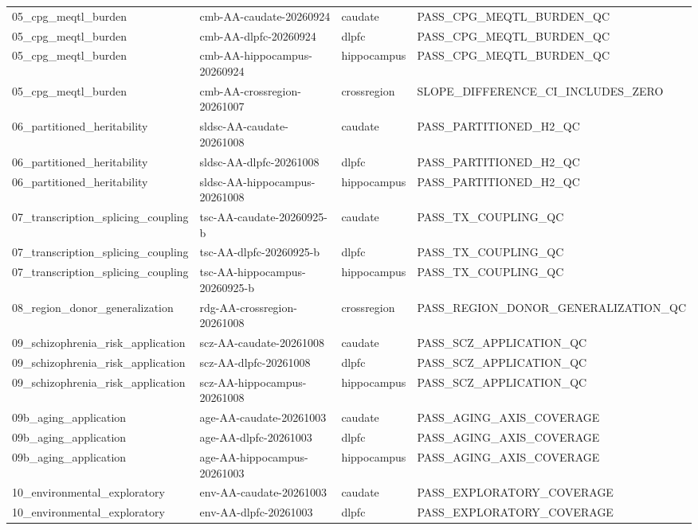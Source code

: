 \begin{tabular}{llll}
05\_cpg\_meqtl\_burden & cmb-AA-caudate-20260924 & caudate & PASS\_CPG\_MEQTL\_BURDEN\_QC \\
05\_cpg\_meqtl\_burden & cmb-AA-dlpfc-20260924 & dlpfc & PASS\_CPG\_MEQTL\_BURDEN\_QC \\
05\_cpg\_meqtl\_burden & cmb-AA-hippocampus-20260924 & hippocampus & PASS\_CPG\_MEQTL\_BURDEN\_QC \\
05\_cpg\_meqtl\_burden & cmb-AA-crossregion-20261007 & crossregion & SLOPE\_DIFFERENCE\_CI\_INCLUDES\_ZERO \\
06\_partitioned\_heritability & sldsc-AA-caudate-20261008 & caudate & PASS\_PARTITIONED\_H2\_QC \\
06\_partitioned\_heritability & sldsc-AA-dlpfc-20261008 & dlpfc & PASS\_PARTITIONED\_H2\_QC \\
06\_partitioned\_heritability & sldsc-AA-hippocampus-20261008 & hippocampus & PASS\_PARTITIONED\_H2\_QC \\
07\_transcription\_splicing\_coupling & tsc-AA-caudate-20260925-b & caudate & PASS\_TX\_COUPLING\_QC \\
07\_transcription\_splicing\_coupling & tsc-AA-dlpfc-20260925-b & dlpfc & PASS\_TX\_COUPLING\_QC \\
07\_transcription\_splicing\_coupling & tsc-AA-hippocampus-20260925-b & hippocampus & PASS\_TX\_COUPLING\_QC \\
08\_region\_donor\_generalization & rdg-AA-crossregion-20261008 & crossregion & PASS\_REGION\_DONOR\_GENERALIZATION\_QC \\
09\_schizophrenia\_risk\_application & scz-AA-caudate-20261008 & caudate & PASS\_SCZ\_APPLICATION\_QC \\
09\_schizophrenia\_risk\_application & scz-AA-dlpfc-20261008 & dlpfc & PASS\_SCZ\_APPLICATION\_QC \\
09\_schizophrenia\_risk\_application & scz-AA-hippocampus-20261008 & hippocampus & PASS\_SCZ\_APPLICATION\_QC \\
09b\_aging\_application & age-AA-caudate-20261003 & caudate & PASS\_AGING\_AXIS\_COVERAGE \\
09b\_aging\_application & age-AA-dlpfc-20261003 & dlpfc & PASS\_AGING\_AXIS\_COVERAGE \\
09b\_aging\_application & age-AA-hippocampus-20261003 & hippocampus & PASS\_AGING\_AXIS\_COVERAGE \\
10\_environmental\_exploratory & env-AA-caudate-20261003 & caudate & PASS\_EXPLORATORY\_COVERAGE \\
10\_environmental\_exploratory & env-AA-dlpfc-20261003 & dlpfc & PASS\_EXPLORATORY\_COVERAGE \\

\end{tabular}
